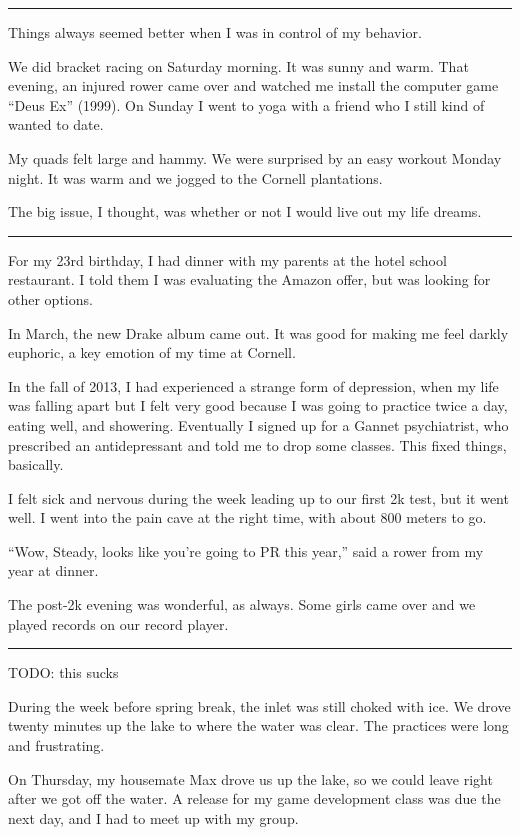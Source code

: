 \plainfancybreak{12pt}{2}{* * *}

Things always seemed better when I was in control of my behavior.

We did bracket racing on Saturday morning.  It was sunny and warm.  That
evening, an injured rower came over and watched me install the computer game
``Deus Ex'' (1999).   On Sunday I went to yoga with a friend who I still kind of
wanted to date.

My quads felt large and hammy.  We were surprised by an easy workout Monday
night.  It was warm and we jogged to the Cornell plantations.

The big issue, I thought, was whether or not I would live out my life dreams.

\plainfancybreak{12pt}{2}{* * *}

For my 23rd birthday, I had dinner with my parents at the hotel school
restaurant.  I told them I was evaluating the Amazon offer, but was looking for
other options.

In March, the new Drake album came out.  It was good for making me feel darkly
euphoric, a key emotion of my time at Cornell.  

In the fall of 2013, I had experienced a strange form of depression, when my
life was falling apart but I felt very good because I was going to practice
twice a day, eating well, and showering.  Eventually I signed up for a Gannet
psychiatrist, who prescribed an antidepressant and told me to drop some classes.
This fixed things, basically. 

I felt sick and nervous during the week leading up to our first 2k test, but it
went well.  I went into the pain cave at the right time, with about 800 meters
to go.  

``Wow, Steady, looks like you're going to PR this year,'' said a rower from my
year at dinner.  

The post-2k evening was wonderful, as always.  Some girls came over and we
played records on our record player.  

\plainfancybreak{12pt}{2}{* * *}

TODO: this sucks

During the week before spring break, the inlet was still choked with ice. We
drove twenty minutes up the lake to where the water was clear.  The practices
were long and frustrating.

On Thursday, my housemate Max drove us up the lake, so we could leave right
after we got off the water.  A release for my game development class was due the
next day, and I had to meet up with my group.

